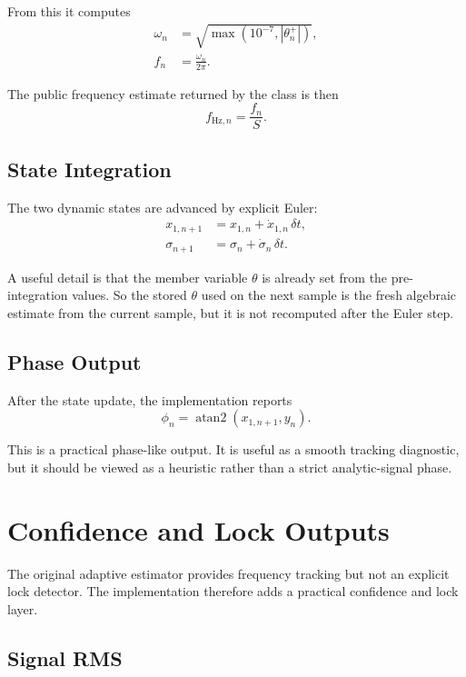 \documentclass[conference]{IEEEtran}
\begin{document}
From this it computes
\begin{align}
  \omega_n &= \sqrt{\max\!\left(10^{-7}, |\theta_n^{+}|\right)},\\
  f_n &= \frac{\omega_n}{2\pi}.
\end{align}

The public frequency estimate returned by the class is then
\begin{equation}
  f_{\text{Hz},n} = \frac{f_n}{S}.
\end{equation}

\subsection{State Integration}

The two dynamic states are advanced by explicit Euler:
\begin{align}
  x_{1,n+1} &= x_{1,n} + \dot{x}_{1,n}\,\delta t,\\
  \sigma_{n+1} &= \sigma_n + \dot{\sigma}_n\,\delta t.
\end{align}

A useful detail is that the member variable $\theta$ is already set from the
pre-integration values. So the stored $\theta$ used on the next sample is the
fresh algebraic estimate from the current sample, but it is not recomputed
after the Euler step.

\subsection{Phase Output}

After the state update, the implementation reports
\begin{equation}
  \phi_n = \operatorname{atan2}(x_{1,n+1}, y_n).
\end{equation}

This is a practical phase-like output. It is useful as a smooth tracking
diagnostic, but it should be viewed as a heuristic rather than a strict
analytic-signal phase.

\section{Confidence and Lock Outputs}

The original adaptive estimator provides frequency tracking but not an
explicit lock detector. The implementation therefore adds a practical
confidence and lock layer.

\subsection{Signal RMS}
\end{document}
